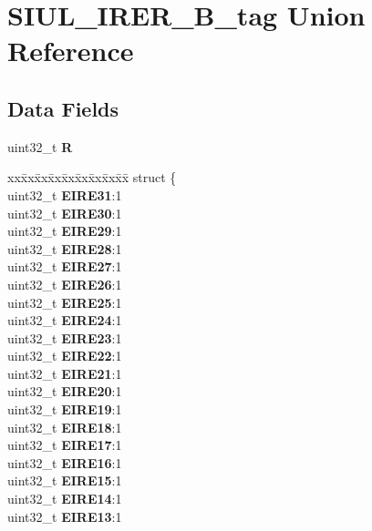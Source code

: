 \hypertarget{unionSIUL__IRER__32B__tag}{}\section{S\+I\+U\+L\+\_\+\+I\+R\+E\+R\+\_\+B\+\_\+tag Union Reference}
\label{unionSIUL__IRER__32B__tag}
\subsection*{Data Fields}
\begin{DoxyCompactItemize}
\item 
\mbox{\label{unionSIUL__IRER__32B__tag_a5e39c8b927dbdaeac0f8da3d6a813591}} 
uint32\+\_\+t {\bfseries R}
\item 
\mbox{\label{unionSIUL__IRER__32B__tag_a6349fbc47633c4de8ce278f91f9c800b}} 
\begin{tabbing}
xx\=xx\=xx\=xx\=xx\=xx\=xx\=xx\=xx\=\kill
struct \{\\
\>uint32\_t {\bfseries EIRE31}:1\\
\>uint32\_t {\bfseries EIRE30}:1\\
\>uint32\_t {\bfseries EIRE29}:1\\
\>uint32\_t {\bfseries EIRE28}:1\\
\>uint32\_t {\bfseries EIRE27}:1\\
\>uint32\_t {\bfseries EIRE26}:1\\
\>uint32\_t {\bfseries EIRE25}:1\\
\>uint32\_t {\bfseries EIRE24}:1\\
\>uint32\_t {\bfseries EIRE23}:1\\
\>uint32\_t {\bfseries EIRE22}:1\\
\>uint32\_t {\bfseries EIRE21}:1\\
\>uint32\_t {\bfseries EIRE20}:1\\
\>uint32\_t {\bfseries EIRE19}:1\\
\>uint32\_t {\bfseries EIRE18}:1\\
\>uint32\_t {\bfseries EIRE17}:1\\
\>uint32\_t {\bfseries EIRE16}:1\\
\>uint32\_t {\bfseries EIRE15}:1\\
\>uint32\_t {\bfseries EIRE14}:1\\
\>uint32\_t {\bfseries EIRE13}:1\\

\end{tabbing}
\end{DoxyCompactItemize}
